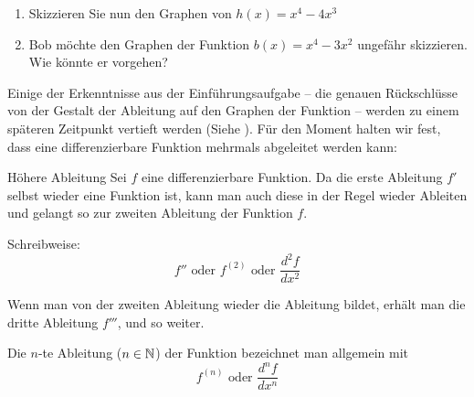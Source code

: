 \begin{LA}
\begin{enumerate}
		\item Skizzieren Sie nun den Graphen von $h(x)=x^4-4x^3$

		      \begin{center}
		      \end{center}
		\item Bob möchte den Graphen der Funktion $b(x)=x^4-3x^2$ ungefähr skizzieren. Wie könnte er vorgehen?
	\end{enumerate}
\end{LA}
\clearpage
Einige der Erkenntnisse aus der Einführungsaufgabe – die genauen Rückschlüsse von der Gestalt der Ableitung auf den Graphen der Funktion – werden zu einem späteren Zeitpunkt vertieft werden (Siehe ). Für den Moment halten wir fest, dass eine differenzierbare Funktion mehrmals abgeleitet werden kann:
\begin{definition}
	{Höhere Ableitung}{}
	Sei $f$ eine differenzierbare Funktion. Da die erste Ableitung $f'$ selbst wieder eine Funktion ist, kann man auch diese in der Regel wieder Ableiten und gelangt so zur zweiten Ableitung der Funktion $f$.

	Schreibweise:
	$$f'' \text{ oder } f^{(2) } \text{ oder } \frac{d^2 f}{dx^2 }$$

	Wenn man von der zweiten Ableitung wieder die Ableitung bildet, erhält man die dritte Ableitung $f'''$, und so weiter.

	Die $n$-te Ableitung ($n\in \mathbb{N}$) der Funktion bezeichnet man allgemein mit
	$$f^{(n)} \text{ oder } \frac{d^n f}{dx^n} $$

\end{definition}

